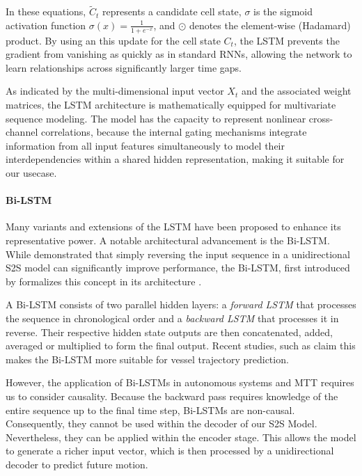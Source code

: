      In these equations, $\tilde{C}_t$ represents a candidate cell state, $\sigma$ is the sigmoid activation function $\sigma(x) = \frac{1}{1 + e^{-x}}$, and $\odot$ denotes the element-wise (Hadamard) product. By using an this update for the cell state $C_t$, the \ac{LSTM} prevents the gradient from vanishing as quickly as in standard \acp{RNN}, allowing the network to learn relationships across significantly larger time gaps.

     As indicated by the multi-dimensional input vector $X_t$ and the associated weight matrices, the \ac{LSTM} architecture is mathematically equipped for multivariate sequence modeling. The model has the capacity to represent nonlinear cross-channel correlations, because the internal gating mechanisms integrate information from all input features simultaneously to model their interdependencies within a shared hidden representation, making it suitable for our usecase. 
    

    \paragraph{Bi-LSTM}
    Many variants and extensions of the \ac{LSTM} have been proposed to enhance its representative power. A notable architectural advancement is the \ac{Bi-LSTM}. While \cite{sutskever2014sequencesequencelearningneural} demonstrated that simply reversing the input sequence in a unidirectional \ac{S2S} model can significantly improve performance, the \ac{Bi-LSTM}, first introduced by \cite{articlebilstmorigins} formalizes this concept in its architecture .
    
    A \ac{Bi-LSTM} consists of two parallel hidden layers: a \textit{forward \ac{LSTM}} that processes the sequence in chronological order and a \textit{backward \ac{LSTM}} that processes it in reverse. Their respective hidden state outputs are then concatenated, added, averaged or multiplied  to form the final output. 
    Recent studies, such as \cite{articlebilstmsus} claim this makes the \ac{Bi-LSTM} more suitable for vessel trajectory prediction. 
   
    However, the application of \acp{Bi-LSTM} in autonomous systems and \ac{MTT} requires us to consider causality. Because the backward pass requires knowledge of the entire sequence up to the final time step, \acp{Bi-LSTM} are non-causal. Consequently, they cannot be used within the decoder of our \ac{S2S} Model. Nevertheless, they can be applied within the encoder stage. This allows the model to generate a richer input vector, which is then processed by a unidirectional decoder to predict future motion. %

